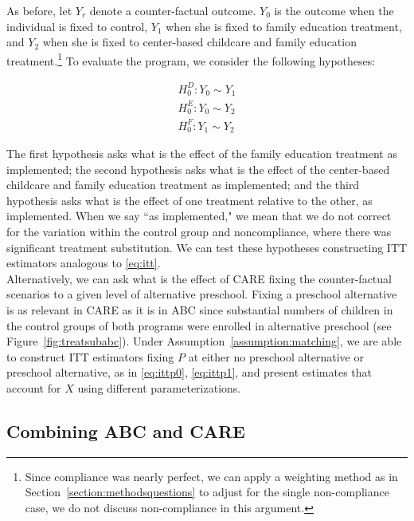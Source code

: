 \noindent As before, let $Y_{r}$ denote a counter-factual outcome. $Y_{0}$ is the outcome when the individual is fixed to control, $Y_{1}$ when she is fixed to family education treatment, and $Y_{2}$ when she is fixed to center-based childcare and family education treatment.\footnote{Since compliance was nearly perfect, we can apply a weighting method as in Section~\ref{section:methodsquestions} to adjust for the single non-compliance case, we do not discuss non-compliance in this argument.} To evaluate the program, we consider the following hypotheses: 

\begin{eqnarray}
H_{0}^D: Y_{0} \sim Y_{1} \\ 
H_{0}^E: Y_{0} \sim Y_{2} \\
H_{0}^F: Y_{1} \sim Y_{2} 
\end{eqnarray}

\noindent The first hypothesis asks what is the effect of the family education treatment as implemented; the second hypothesis asks what is the effect of the center-based childcare and family education treatment as implemented; and the third hypothesis asks what is the effect of one treatment relative to the other, as implemented. When we say ``as implemented," we mean that we do not correct for the variation within the control group and noncompliance, where there was significant treatment substitution. We can test these hypotheses constructing ITT estimators analogous to \eqref{eq:itt}.\\ 

\noindent Alternatively, we can ask what is the effect of CARE fixing the counter-factual scenarios to a given level of alternative preschool. Fixing a preschool alternative is as relevant in CARE as it is in ABC since substantial numbers of children in the control groups of both programs were enrolled in alternative preschool (see Figure~\ref{fig:treatsubabc}). Under Assumption~\ref{assumption:matching}, we are able to construct ITT estimators fixing $P$ at either no preschool alternative or preschool alternative, as in \eqref{eq:ittp0}, \eqref{eq:ittp1}, and present estimates that account for $X$ using different parameterizations.\\

\subsection{Combining ABC and CARE}


